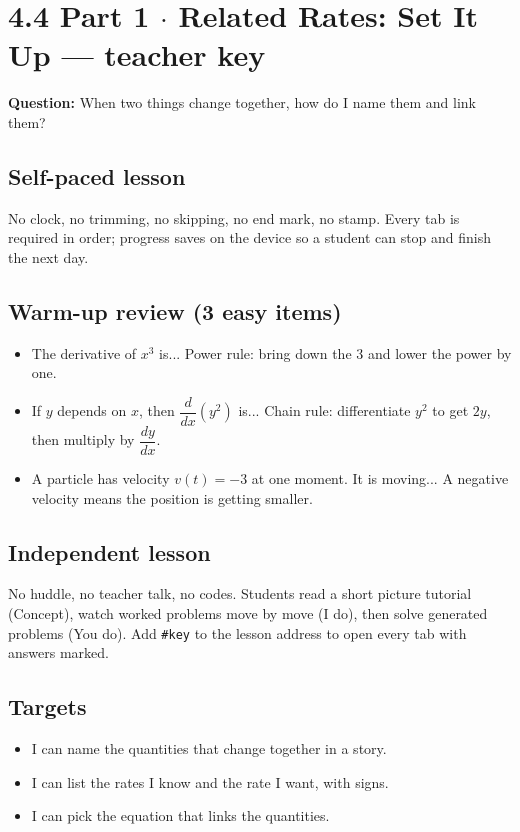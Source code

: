 \documentclass[11pt]{article}
\begin{document}
\section*{4.4 Part 1 $\cdot$ Related Rates: Set It Up --- teacher key}
\textbf{Question:} When two things change together, how do I name them and link them?\par
\subsection*{Self-paced lesson}No clock, no trimming, no skipping, no end mark, no stamp. Every tab is required in order; progress saves on the device so a student can stop and finish the next day.\par
\subsection*{Warm-up review (3 easy items)}\begin{itemize}
\item The derivative of $x^3$ is...  Power rule: bring down the 3 and lower the power by one.
\item If $y$ depends on $x$, then $\dfrac{d}{dx}(y^2)$ is...  Chain rule: differentiate $y^2$ to get $2y$, then multiply by $\dfrac{dy}{dx}$.
\item A particle has velocity $v(t)=-3$ at one moment. It is moving...  A negative velocity means the position is getting smaller.
\end{itemize}
\subsection*{Independent lesson}No huddle, no teacher talk, no codes. Students read a short picture tutorial (Concept), watch worked problems move by move (I do), then solve generated problems (You do). Add \texttt{\#key} to the lesson address to open every tab with answers marked.\par
\subsection*{Targets}\begin{itemize}\item I can name the quantities that change together in a story.
\item I can list the rates I know and the rate I want, with signs.
\item I can pick the equation that links the quantities.\end{itemize}
\end{document}
